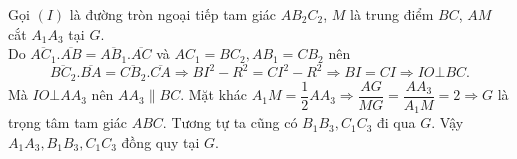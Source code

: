 \begin{bt}
{\begin{center}
		\end{center}
		Gọi $\left( I \right)$ là đường tròn ngoại tiếp tam giác $A{{B}_{2}}{{C}_{2}}$, $M$ là trung điểm $BC$, $AM$ cắt ${{A}_{1}}{{A}_{3}}$ tại $G$.\\
		Do $\overline{A{{C}_{1}}}.\overline{AB}=\overline{A{{B}_{1}}}.\overline{AC}$ và $A{{C}_{1}}=B{{C}_{2}},A{{B}_{1}}=C{{B}_{2}}$ nên \[\overline{B{{C}_{2}}}.\overline{BA}=\overline{C{{B}_{2}}}.\overline{CA}\Rightarrow B{{I}^{2}}-{{R}^{2}}=C{{I}^{2}}-{{R}^{2}}\Rightarrow BI=CI\Rightarrow IO\bot BC.\]
		Mà $IO\bot A{{A}_{3}}$ nên $A{{A}_{3}}\parallel BC$. Mặt khác ${{A}_{1}}M=\dfrac{1}{2}A{{A}_{3}}\Rightarrow \dfrac{AG}{MG}=\dfrac{A{{A}_{3}}}{{{A}_{1}}M}=2\Rightarrow G$ là trọng tâm tam giác $ABC$.
		Tương tự ta cũng có ${{B}_{1}}{{B}_{3}},{{C}_{1}}{{C}_{3}}$ đi qua $G$. Vậy ${{A}_{1}}{{A}_{3}},{{B}_{1}}{{B}_{3}},{{C}_{1}}{{C}_{3}}$ đồng quy tại $G$.
	}
\end{bt}
